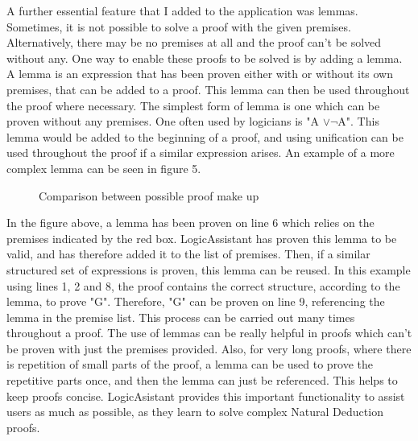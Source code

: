 A further essential feature that I added to the application was lemmas. Sometimes, it is not possible to solve a proof with the given premises. Alternatively, there may be no premises at all and the proof can't be solved without any. One way to enable these proofs to be solved is by adding a lemma. A lemma is an expression that has been proven either with or without its own premises, that can be added to a proof. This lemma can then be used throughout the proof where necessary. The simplest form of lemma is one which can be proven without any premises. One often used by logicians is "A $\vee \neg$A". This lemma would be added to the beginning of a proof, and using unification can be used throughout the proof if a similar expression arises. An example of a more complex lemma can be seen in figure 5.

\begin{figure}[!ht]
	\centering
	\caption{Comparison between possible proof make up}
\end{figure}

In the figure above, a lemma has been proven on line 6 which relies on the premises indicated by the red box. LogicAssistant has proven this lemma to be valid, and has therefore added it to the list of premises. Then, if a similar structured set of expressions is proven, this lemma can be reused. In this example using lines 1, 2 and 8, the proof contains the correct structure, according to the lemma, to prove "G". Therefore, "G" can be proven on line 9, referencing the lemma in the premise list. This process can be carried out many times throughout a proof. The use of lemmas can be really helpful in proofs which can't be proven with just the premises provided. Also, for very long proofs, where there is repetition of small parts of the proof, a lemma can be used to prove the repetitive parts once, and then the lemma can just be referenced. This helps to keep proofs concise. LogicAsistant provides this important functionality to assist users as much as possible, as they learn to solve complex Natural Deduction proofs. 


